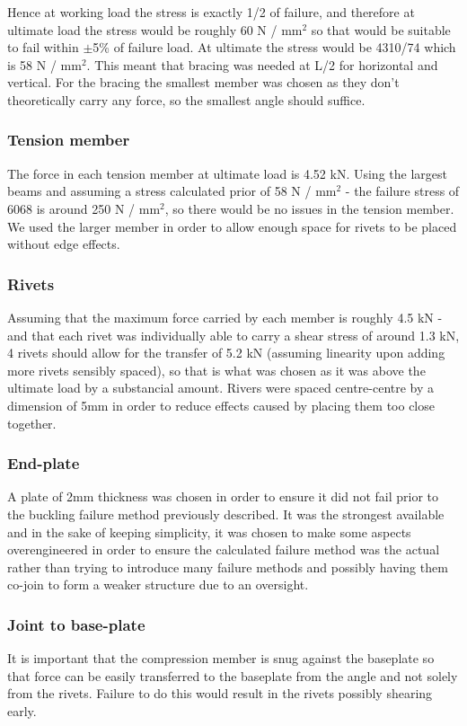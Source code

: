 \documentclass[12pt]{article}
\begin{document}
                    Hence at working load the stress is exactly 1/2 of failure, and therefore at ultimate load the stress would be roughly 60 N / mm$^2$ so that would be suitable to fail within
                    $\pm$5\% of failure load. At ultimate the stress would be 4310/74 which is 58 N / mm$^2$. This meant that bracing was needed at L/2 for horizontal and vertical. For the bracing
                    the smallest member was chosen as they don't theoretically carry any force, so the smallest angle should suffice.
                \subsubsection{Tension member}
                    The force in each tension member at ultimate load is 4.52 kN. Using the largest beams and assuming a stress calculated prior of 58 N / mm$^2$ - the failure
                    stress of 6068 is around 250 N / mm$^2$, so there would be no issues in the tension member. We used the larger member in order to allow enough space for rivets to be
                    placed without edge effects.
                \subsubsection{Rivets}
                    Assuming that the maximum force carried by each member is roughly 4.5 kN - and that each rivet was individually able to carry a shear stress of around 1.3 kN,
                    4 rivets should allow for the transfer of 5.2 kN (assuming linearity upon adding more rivets sensibly spaced), so that is what was chosen as it was above the
                    ultimate load by a substancial amount. Rivers were spaced centre-centre by a dimension of 5mm in order to reduce effects caused by placing them too close together. 
                \subsubsection{End-plate}
                    A plate of 2mm thickness was chosen in order to ensure it did not fail prior to the buckling failure method previously described. It was the strongest available
                    and in the sake of keeping simplicity, it was chosen to make some aspects overengineered in order to ensure the calculated failure method was the actual rather than
                    trying to introduce many failure methods and possibly having them co-join to form a weaker structure due to an oversight. 
                \subsubsection{Joint to base-plate}
                    It is important that the compression member is snug against the baseplate so that force can be easily transferred to the baseplate from the angle and not solely from the rivets.
                    Failure to do this would result in the rivets possibly shearing early.
\end{document}
